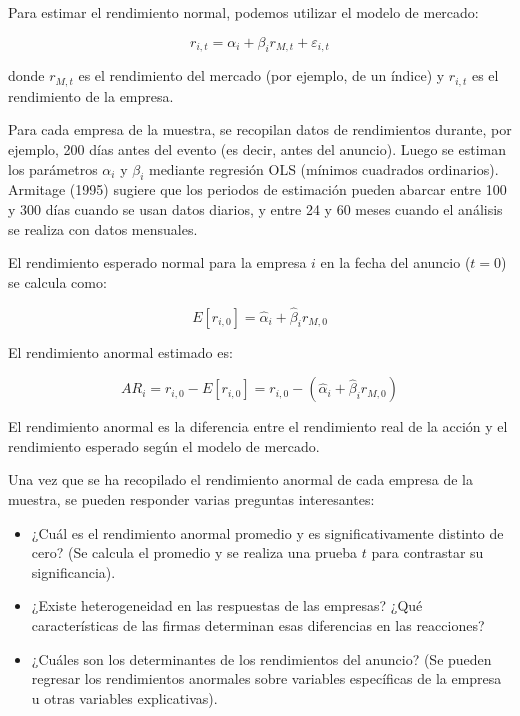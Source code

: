 Para estimar el rendimiento normal, podemos utilizar el modelo de mercado:

\begin{equation}
r_{i,t} = \alpha_i + \beta_i r_{M,t} + \varepsilon_{i,t}
\end{equation}

donde $r_{M,t}$ es el rendimiento del mercado (por ejemplo, de un índice) y $r_{i,t}$ es el rendimiento de la empresa.

Para cada empresa de la muestra, se recopilan datos de rendimientos durante, por ejemplo, 200 días antes del evento (es decir, antes del anuncio). Luego se estiman los parámetros $\alpha_i$ y $\beta_i$ mediante regresión OLS (mínimos cuadrados ordinarios). Armitage (1995) sugiere que los periodos de estimación pueden abarcar entre 100 y 300 días cuando se usan datos diarios, y entre 24 y 60 meses cuando el análisis se realiza con datos mensuales.

El rendimiento esperado normal para la empresa $i$ en la fecha del anuncio ($t = 0$) se calcula como:

\begin{equation}
E[r_{i,0}] = \hat{\alpha}_i + \hat{\beta}_i r_{M,0}
\end{equation}

El rendimiento anormal estimado es:

\begin{equation}
AR_i = r_{i,0} - E[r_{i,0}] = r_{i,0} - (\hat{\alpha}_i + \hat{\beta}_i r_{M,0})
\end{equation}

El rendimiento anormal es la diferencia entre el rendimiento real de la acción y el rendimiento esperado según el modelo de mercado.

Una vez que se ha recopilado el rendimiento anormal de cada empresa de la muestra, se pueden responder varias preguntas interesantes:
\begin{itemize}
\item ¿Cuál es el rendimiento anormal promedio y es significativamente distinto de cero? (Se calcula el promedio y se realiza una prueba $t$ para contrastar su significancia).
\item ¿Existe heterogeneidad en las respuestas de las empresas? ¿Qué características de las firmas determinan esas diferencias en las reacciones?
\item ¿Cuáles son los determinantes de los rendimientos del anuncio? (Se pueden regresar los rendimientos anormales sobre variables específicas de la empresa u otras variables explicativas).
\end{itemize}

